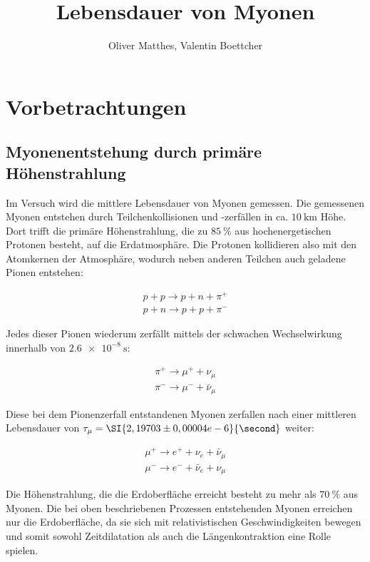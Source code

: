 \documentclass[slug=LM, room=Andreas-Schubert-Bau\,\ K\ 1A, supervisor=Anne-Sophie\ Berthold, coursedate=13.\ 12.\ 2019]{../../Lab_Report_LaTeX/lab_report}
\title{Lebensdauer von Myonen}
\author{Oliver Matthes, Valentin Boettcher}
\begin{document}
\maketitle

\section{Vorbetrachtungen}
\label{sec:einl}

\subsection{Myonenentstehung durch primäre Höhenstrahlung}
\label{sec:myonenenst}

Im Versuch wird die mittlere Lebensdauer von Myonen gemessen.
Die gemessenen Myonen entstehen durch Teilchenkollisionen und -zerfällen in ca.
\(\SI{10}{\kilo\metre}\) Höhe. Dort trifft die primäre Höhenstrahlung, die zu
\(\SI{85}{\percent}\) aus hochenergetischen Protonen besteht, auf die Erdatmosphäre.
Die Protonen kollidieren also mit den Atomkernen der Atmosphäre, wodurch neben anderen Teilchen
auch geladene Pionen entstehen:

\begin{align}\label{eq:pionen}
 p + p \rightarrow p + n + \pi^+ \\
 p + n \rightarrow p + p + \pi^-
\end{align}

Jedes dieser Pionen wiederum zerfällt mittels der schwachen Wechselwirkung innerhalb von
\(\SI{2,6e-8}{\second}\):

\begin{align}\label{eq:myonen}
\pi^+ \rightarrow \mu^+ + \nu_\mu \\
\pi^- \rightarrow \mu^- + \bar\nu_\mu
\end{align}

Diese bei dem Pionenzerfall entstandenen Myonen zerfallen nach einer mittleren Lebensdauer von
\(\tau_\mu = \SI{2,19703\pm0,00004e-6}{\second}\) weiter:

\begin{align}
        \mu^+ \rightarrow e^+ + \nu_e + \bar\nu_\mu \\
        \mu^- \rightarrow e^- + \bar\nu_e + \nu_\mu
\end{align}

Die Höhenstrahlung, die die Erdoberfläche erreicht besteht zu mehr als \(\SI{70}{\percent}\)
aus Myonen. Die bei oben beschriebenen Prozessen entstehenden Myonen erreichen nur die
Erdoberfläche, da sie sich mit relativistischen Geschwindigkeiten bewegen und somit sowohl
Zeitdilatation als auch die Längenkontraktion eine Rolle spielen.\\
\end{document}
